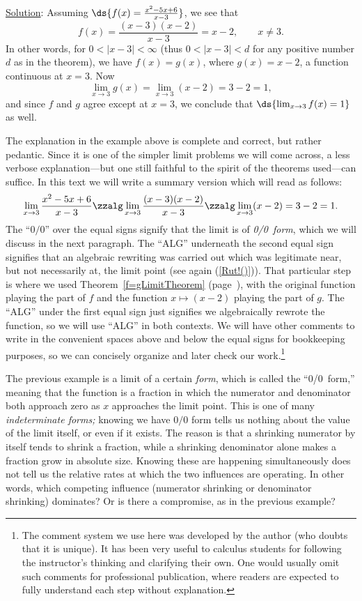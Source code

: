 \underline{Solution}: Assuming $\ds{f(x)=\frac{x^2-5x+6}{x-3}}$,
we see that
\begin{equation}
f(x)=\frac{(x-3)(x-2)}{x-3}=x-2,\qquad x\ne3.\label{Rut!()}\end{equation}
In other words, for $0<|x-3|<\infty$
(thus $0<|x-3|<d$ for any positive number $d$ as in the theorem), we have
$f(x)=g(x)$, where $g(x)=x-2$, a function continuous at $x=3$.
Now 
$$\lim_{x\to3}g(x)=\lim_{x\to3}(x-2)=3-2=1,$$
and since $f$ and $g$ agree except at $x=3$, we conclude that
$\ds{\lim_{x\to 3}f(x)=1}$ as well.
\eex

The explanation in the example above is complete and correct,
but rather pedantic.  Since it is one of the simpler limit problems
we will come across, a less verbose explanation---but one still
faithful to the spirit of the theorems used---can suffice.
In this text we will write a summary version
which will read as follows:
$$\lim_{x\to3}\frac{x^2-5x+6}{x-3}
\zzalg
\lim_{x\to3}\frac{(x-3)(x-2)}{x-3}
\zzalg
\lim_{x\to3}(x-2)=3-2=1.$$
The ``$0/0$'' over the equal signs signify that the 
limit is of {\it 0/0~form}, which we will discuss
in the next paragraph.
The ``ALG'' underneath the second equal sign signifies that
an algebraic rewriting was carried out which was legitimate
near, but not necessarily at, the limit point
(see again (\ref{Rut!()})).   That 
particular step is where we used Theorem~\ref{f=gLimitTheorem}
(page~\pageref{f=gLimitTheorem}), with 
the original function playing the part of $f$ and
the function $x\longmapsto (x-2)$ playing the part
of $g$. The ``ALG''
under the first equal sign just signifies we algebraically rewrote
the function, so we will use ``ALG'' in both contexts.
We will have other comments to write in the convenient spaces
above and below 
the equal signs for bookkeeping purposes, so we can concisely
organize and later check our work.\footnote{%
The comment system we use here was
developed by the author (who doubts that it is unique). 
It has been very useful 
to calculus students for following the instructor's thinking and
clarifying their own. One would usually omit such comments
for  professional publication, where readers are expected
to fully understand each step without explanation.
}


The previous example is a limit of a certain {\it form},
which is called the ``0/0~form,'' meaning that the 
function is a fraction in which the numerator and denominator both
approach zero as $x$ approaches the limit point.  
This is one of many {\it indeterminate
forms; }knowing we have $0/0$ form tells
us nothing about the value of the limit itself, or even if
it exists.  The reason is that
a shrinking numerator by itself tends to shrink a
fraction, while a shrinking denominator alone makes a fraction
grow in absolute size.  Knowing these are happening simultaneously does
not tell us the relative rates at which the two influences are
operating.  In other words, which competing 
influence (numerator shrinking or
denominator shrinking) dominates?  Or is there a compromise, as
in the previous example?

